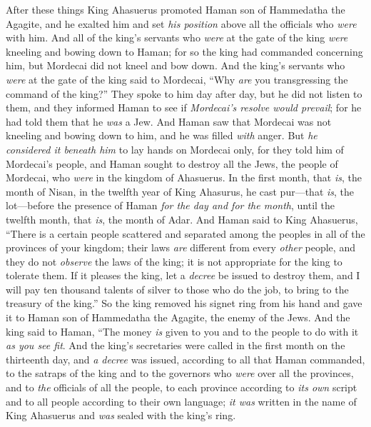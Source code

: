 \begin{biblechapter} %
 After these things King Ahasuerus promoted Haman son of Hammedatha the Agagite, and he exalted him and set \textit{his position} above all the officials who \textit{were} with him.
\verse And all of the king’s servants who \textit{were} at the gate of the king \textit{were} kneeling and bowing down to Haman; for so the king had commanded concerning him, but Mordecai did not kneel and bow down.
\verse And the king’s servants who \textit{were} at the gate of the king said to Mordecai, “Why \textit{are} you transgressing the command of the king?”
\verse They spoke to him day after day, but he did not listen to them, and they informed Haman to see if \textit{Mordecai’s resolve would prevail}; for he had told them that he \textit{was} a Jew.
\verse And Haman saw that Mordecai was not kneeling and bowing down to him, and he was filled \textit{with} anger.
\verse But \textit{he considered it beneath him} to lay hands on Mordecai only, for they told him of Mordecai’s people, and Haman sought to destroy all the Jews, the people of Mordecai, who \textit{were} in the kingdom of Ahasuerus.
\verse In the first month, that \textit{is}, the month of Nisan, in the twelfth year of King Ahasurus, he cast pur—that \textit{is}, the lot—before the presence of Haman \textit{for the day and for the month}, until the twelfth month, that \textit{is}, the month of Adar.
\verse And Haman said to King Ahasuerus, “There is a certain people scattered and separated among the peoples in all of the provinces of your kingdom; their laws \textit{are} different from every \textit{other} people, and they do not \textit{observe} the laws of the king; it is not appropriate for the king to tolerate them.
\verse If it pleases the king, let a \textit{decree} be issued to destroy them, and I will pay ten thousand talents of silver to those who do the job, to bring to the treasury of the king.”
\verse So the king removed his signet ring from his hand and gave it to Haman son of Hammedatha the Agagite, the enemy of the Jews.
\verse And the king said to Haman, “The money \textit{is} given to you and to the people to do with it \textit{as you see fit}.
\verse And the king’s secretaries were called in the first month on the thirteenth day, and \textit{a decree} was issued, according to all that Haman commanded, to the satraps of the king and to the governors who \textit{were} over all the provinces, and to \textit{the} officials of all the people, to each province according to \textit{its own} script and to all people according to their own language; \textit{it was} written in the name of King Ahasuerus and \textit{was} sealed with the king’s ring.

\end{biblechapter}
